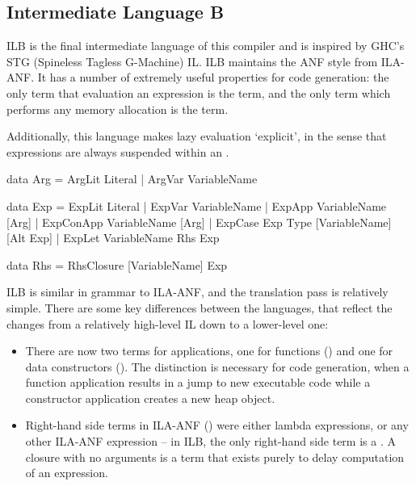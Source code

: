 \documentclass[dissertation.tex]{subfiles}
\begin{document}
{    \subsection{Intermediate Language B}
    {
        ILB is the final intermediate language of this compiler and is inspired by GHC's STG (Spineless Tagless G-Machine) IL. ILB maintains the ANF style from ILA-ANF. It has a number of extremely useful properties for code generation: the only term that evaluation an expression is the  term, and the only term which performs any memory allocation is the  term.

        Additionally, this language makes lazy evaluation `explicit', in the sense that expressions are always suspended within an .

        \begin{haskellfigure}
        data Arg = ArgLit Literal
                 | ArgVar VariableName

        data Exp = ExpLit Literal
                 | ExpVar VariableName
                 | ExpApp VariableName [Arg]
                 | ExpConApp VariableName [Arg]
                 | ExpCase Exp Type [VariableName] [Alt Exp]
                 | ExpLet VariableName Rhs Exp

        data Rhs = RhsClosure [VariableName] Exp
        \end{haskellfigure}

        ILB is similar in grammar to ILA-ANF, and the translation pass is relatively simple. There are some key differences between the languages, that reflect the changes from a relatively high-level IL down to a lower-level one:

        \begin{itemize}
        \item
        {
            There are now two terms for applications, one for functions () and one for data constructors (). The distinction is necessary for code generation, when a function application results in a jump to new executable code while a constructor application creates a new heap object. 
        }
        \item
        {
            Right-hand side terms in ILA-ANF () were either lambda expressions, or any other ILA-ANF expression -- in ILB, the only right-hand side term is a . A closure with no arguments is a term that exists purely to delay computation of an expression.

}
\end{itemize}}}
\end{document}
